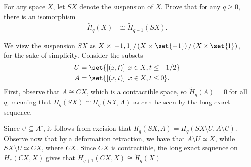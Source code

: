 \documentclass[10pt]{mypackage}
\begin{document}
\begin{problem}[Problem 2]
  For any space $X$, let $SX$ denote the suspension of $X$. Prove that for any $q\geq 0$, there is an isomorphism
  \begin{align*}
    \widetilde{H}_q(X) &\cong \widetilde{H}_{q+1}\left( SX \right).
  \end{align*}
\end{problem}
\begin{solution}
  We view the suspension $SX$ as $X\times \left[ -1,1 \right]/\left( X\times \set{-1} \right)/\left( X\times \set{1} \right)$, for the sake of simplicity. Consider the subsets
  \begin{align*}
    U &= \set{\left[ \left( x,t \right) \right] | x\in X,t \leq -1/2}\\
    A &= \set{\left[ \left( x,t \right) \right] | x\in X, t \leq 0}.
  \end{align*}
  First, observe that $A\cong CX$, which is a contractible space, so $\widetilde{H}_q(A) = 0$ for all $q$, meaning that $ \widetilde{H}_q\left( SX \right)\cong \widetilde{H}_q\left( SX,A \right) $ as can be seen by the long exact sequence.
  \begin{center}
  \end{center}
  Since $ \overline{U}\subseteq A^{\circ}$, it follows from excision that $\widetilde{H}_{q}\left( SX,A \right) = \widetilde{H}_{q}\left( SX\setminus U,A\setminus U \right)$. Observe now that by a deformation retraction, we have that $ A\setminus U\simeq X $, while $SX\setminus U\simeq CX$, where $CX$. Since $CX$ is contractible, the long exact sequence on $ H_{\ast}\left( CX,X \right) $ gives that $\widetilde{H}_{q+1}\left( CX,X \right)\cong \widetilde{H}_{q}(X)$
  \begin{center}

\end{center}
\end{solution}
\end{document}
